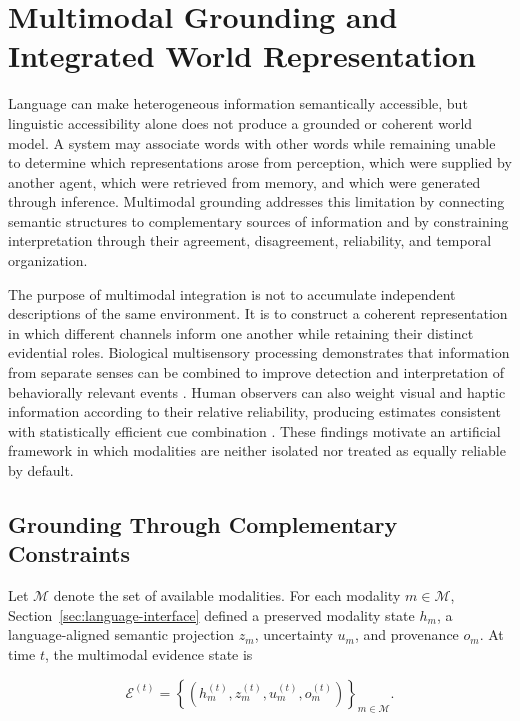 \section{\textbf{Multimodal Grounding and Integrated World Representation}}
\label{sec:multimodal-grounding}

Language can make heterogeneous information semantically accessible, but linguistic accessibility alone does not produce a grounded or coherent world model. A system may associate words with other words while remaining unable to determine which representations arose from perception, which were supplied by another agent, which were retrieved from memory, and which were generated through inference. Multimodal grounding addresses this limitation by connecting semantic structures to complementary sources of information and by constraining interpretation through their agreement, disagreement, reliability, and temporal organization.

The purpose of multimodal integration is not to accumulate independent descriptions of the same environment. It is to construct a coherent representation in which different channels inform one another while retaining their distinct evidential roles. Biological multisensory processing demonstrates that information from separate senses can be combined to improve detection and interpretation of behaviorally relevant events \cite{stein2008multisensory}. Human observers can also weight visual and haptic information according to their relative reliability, producing estimates consistent with statistically efficient cue combination \cite{ernst2002humans}. These findings motivate an artificial framework in which modalities are neither isolated nor treated as equally reliable by default.

\subsection{Grounding Through Complementary Constraints}
\label{subsec:complementary-grounding}

Let $\mathcal{M}$ denote the set of available modalities. For each modality $m\in\mathcal{M}$, Section~\ref{sec:language-interface} defined a preserved modality state $h_m$, a language-aligned semantic projection $z_m$, uncertainty $u_m$, and provenance $o_m$. At time $t$, the multimodal evidence state is

\begin{equation}
\mathcal{E}^{(t)}
=
\left\{
\left(h_m^{(t)},z_m^{(t)},u_m^{(t)},o_m^{(t)}\right)
\right\}_{m\in\mathcal{M}}.
\label{eq:multimodal-evidence-state}
\end{equation}

